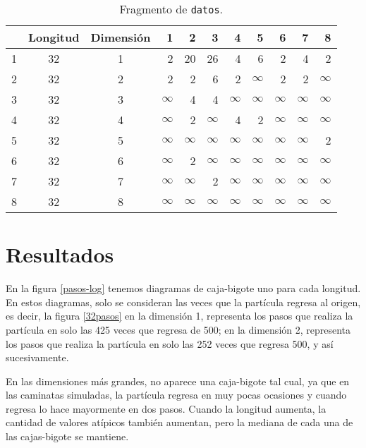\documentclass[12pt,letterpaper]{article}
\begin{document}
\begin{table}[ht]
\centering
\caption{Fragmento de \texttt{datos}.}
\begin{tabular}{cccrrrrrrrr}
  \hline
 & Longitud & Dimensión & 1 & 2 & 3 & 4 & 5 & 6 & 7 & 8 \\ 
  \hline
1 & 32 & 1 & 2 & 20 & 26 & 4 & 6 & 2 & 4 & 2 \\ 
  2 & 32 & 2 & 2 & 2 & 6 & 2 & $\infty$ & 2 & 2 & $\infty$ \\ 
  3 & 32 & 3 & $\infty$ & 4 & 4 & $\infty$ & $\infty$ & $\infty$ & $\infty$ & $\infty$ \\ 
  4 & 32 & 4 & $\infty$ & 2 & $\infty$ & 4 & 2 & $\infty$ & $\infty$ & $\infty$ \\ 
  5 & 32 & 5 & $\infty$ & $\infty$ & $\infty$ & $\infty$ & $\infty$ & $\infty$ & $\infty$ & 2 \\ 
  6 & 32 & 6 & $\infty$ & 2 & $\infty$ & $\infty$ & $\infty$ & $\infty$ & $\infty$ & $\infty$ \\ 
  7 & 32 & 7 & $\infty$ & $\infty$ & 2 & $\infty$ & $\infty$ & $\infty$ & $\infty$ & $\infty$ \\ 
  8 & 32 & 8 & $\infty$ & $\infty$ & $\infty$ & $\infty$ & $\infty$ & $\infty$ & $\infty$ & $\infty$ \\ 
   \hline
\end{tabular}
\label{datos}
\end{table}

\section{Resultados} 
 
 En la figura \ref{pasos-log} tenemos diagramas de caja-bigote uno para cada longitud. En estos diagramas, solo se consideran las veces que la partícula regresa al origen, es decir, la figura \ref{32pasos} en la dimensión 1, representa los pasos que realiza la partícula en solo las 425 veces que regresa de 500; en la dimensión 2, representa los pasos que realiza la partícula en solo las 252 veces que regresa 500, y así sucesivamente. 

En las dimensiones más grandes, no aparece una caja-bigote tal cual, ya que en las caminatas simuladas, la partícula regresa en muy pocas ocasiones y cuando regresa lo hace mayormente en dos pasos. Cuando la longitud aumenta, la cantidad de valores atípicos también aumentan, pero la mediana de cada una de las cajas-bigote se mantiene. 
\end{document}
